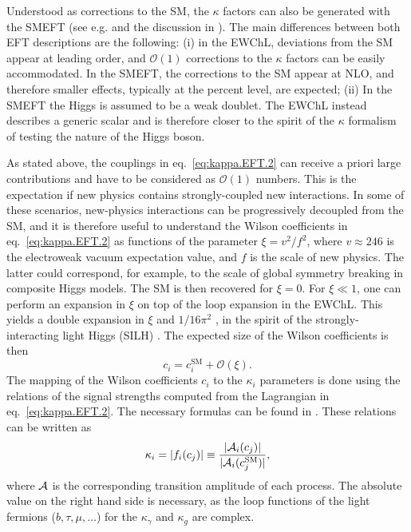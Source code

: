 Understood as corrections to the SM, the $\kappa$ factors can also be generated with the SMEFT (see e.g.\cite{Ghezzi:2015vva} and the discussion in \cite{Brivio:2017vri}). The main differences between both EFT descriptions are the following: (i) in the EWChL, deviations from the SM appear at leading order, and $\mathcal{O}(1)$ corrections to the $\kappa$ factors can be easily accommodated. In the SMEFT, the corrections to the SM appear at NLO, and therefore smaller effects, typically at the percent level, are expected; (ii) In the SMEFT the Higgs is assumed to be a weak doublet. The EWChL instead describes a generic scalar and is therefore closer to the spirit of the $\kappa$ formalism of testing the nature of the Higgs boson.
 
As stated above, the couplings in eq.~\eqref{eq:kappa.EFT.2} can receive a priori large contributions and have to be considered as $\mathcal{O}(1)$ numbers. This is the expectation if new physics contains strongly-coupled new interactions. In some of these scenarios, new-physics interactions can be progressively decoupled from the SM, and it is therefore useful to understand the Wilson coefficients in eq.~\eqref{eq:kappa.EFT.2} as functions of the parameter $\xi = v^{2}/f^{2}$, where $v\approx 246$ \UGeV is the electroweak vacuum expectation value, and $f$ is the scale of new physics. The latter could correspond, for example, to the scale of global symmetry breaking in composite Higgs models. The SM is then recovered for $\xi=0$. For $\xi\ll 1$, one can perform an expansion in $\xi$ on top of the loop expansion in the EWChL. This yields a double expansion in $\xi$ and $1/16\pi^{2}$ \cite{Buchalla:2014eca}, in the spirit of the strongly-interacting light Higgs (SILH) \cite{Giudice:2007fh}. The expected size of the Wilson coefficients is then
\begin{equation}
  \label{eq:kappa.EFT.4}
    c_{i} =  c_{i}^{\text{SM}} + \mathcal{O}(\xi).
\end{equation}
The mapping of the Wilson coefficients $c_{i}$ to the $\kappa_{i}$ parameters is done using the relations of the signal strengths computed from the Lagrangian in eq.~\eqref{eq:kappa.EFT.2}. The necessary formulas can be found in \cite{Buchalla:2015qju,deBlas:2018tjm}. These relations can be written as
%
\begin{equation}
\label{eq:kappa.EFT.5}
  \kappa_{i} =  |f_i(c_{j})| \equiv \frac{|{\cal A}_i(c_{j})|}{|{\cal A}_i(c_{j}^{\text{SM}})|}, 
\end{equation}
%
where ${\cal A}$ is the corresponding transition amplitude of each process. 
The absolute value on the right hand side is necessary, as the loop functions of the light fermions ($b,\tau,\mu,\dots$) for the $\kappa_{\gamma}$ and $\kappa_{g}$ are complex.

